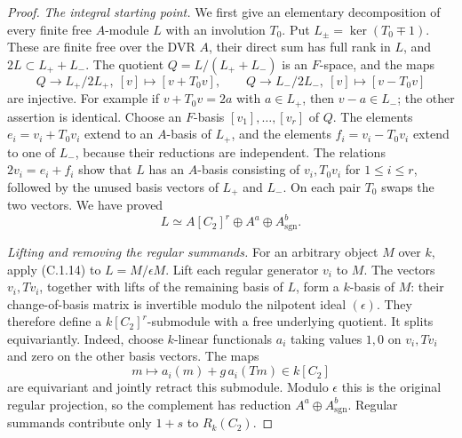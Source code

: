 \begin{proof}
\emph{The integral starting point.}
We first give an elementary decomposition of every finite free
$A$-module $L$ with an involution $T_0$. Put
$L_\pm=\ker(T_0\mp1)$. These are finite free over the DVR $A$,
their direct sum has full rank in $L$, and $2L\subset L_++L_-$.
The quotient $Q=L/(L_++L_-)$ is an $F$-space, and the maps
\[
 Q\longrightarrow L_+/2L_+,\ [v]\longmapsto[v+T_0v],
 \qquad
 Q\longrightarrow L_-/2L_-,\ [v]\longmapsto[v-T_0v]
\]
are injective. For example if $v+T_0v=2a$ with $a\in L_+$,
then $v-a\in L_-$; the other assertion is identical.
Choose an $F$-basis $[v_1],\ldots,[v_r]$ of $Q$.
The elements $e_i=v_i+T_0v_i$ extend to an $A$-basis of $L_+$,
and the elements $f_i=v_i-T_0v_i$ extend to one of $L_-$,
because their reductions are independent. The relations
$2v_i=e_i+f_i$ show that $L$ has an $A$-basis consisting of
$v_i,T_0v_i$ for $1\le i\le r$, followed by the unused basis
vectors of $L_+$ and $L_-$. On each pair $T_0$ swaps the two
vectors. We have proved
\[
 L\simeq A[C_2]^r\oplus A^a\oplus A_{\mathrm{sgn}}^b.  \tag{C.1.14}
\]

\emph{Lifting and removing the regular summands.}
For an arbitrary object $M$ over $k$, apply (C.1.14) to
$L=M/\epsilon M$. Lift each regular generator $v_i$ to $M$.
The vectors $v_i,Tv_i$, together with lifts of the remaining
basis of $L$, form a $k$-basis of $M$: their change-of-basis
matrix is invertible modulo the nilpotent ideal $(\epsilon)$.
They therefore define a $k[C_2]^r$-submodule with a free
underlying quotient. It splits equivariantly. Indeed, choose
$k$-linear functionals $a_i$ taking values $1,0$ on
$v_i,Tv_i$ and zero on the other basis vectors. The maps
\[
 m\longmapsto a_i(m)+g\,a_i(Tm)\in k[C_2]
\]
are equivariant and jointly retract this submodule. Modulo
$\epsilon$ this is the original regular projection, so the
complement has reduction $A^a\oplus A_{\mathrm{sgn}}^b$.
Regular summands contribute only $1+s$ to $R_k(C_2)$.


\end{proof}
